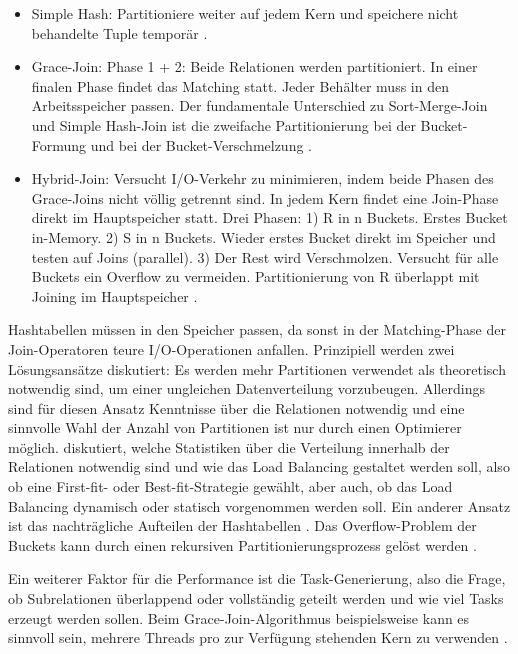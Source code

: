 \documentclass[a4paper,12pt,twoside]{article}
\begin{document}
{\begin{itemize}
	\item Simple Hash: Partitioniere weiter auf jedem Kern und speichere nicht behandelte Tuple temporär \parencite{Lu1994}.
	\item Grace-Join: Phase 1 + 2: Beide Relationen werden partitioniert. In einer finalen Phase findet das Matching statt. Jeder Behälter muss in den Arbeitsspeicher passen. Der fundamentale Unterschied zu Sort-Merge-Join und Simple Hash-Join ist die zweifache Partitionierung bei der Bucket-Formung und bei der Bucket-Verschmelzung \parencite{Schneider1989}.
	\item Hybrid-Join: Versucht I/O-Verkehr zu minimieren, indem beide Phasen des Grace-Joins nicht völlig getrennt sind. In jedem Kern findet eine Join-Phase direkt im Hauptspeicher statt. Drei Phasen: 1) R in n Buckets. Erstes Bucket in-Memory. 2) S in n Buckets. Wieder erstes Bucket direkt im Speicher und testen auf Joins (parallel). 3) Der Rest wird Verschmolzen. Versucht für alle Buckets ein Overflow zu vermeiden. Partitionierung von R überlappt mit Joining im Hauptspeicher \parencite{Schneider1989}.
\end{itemize}

Hashtabellen müssen in den Speicher passen, da sonst in der Matching-Phase der Join-Operatoren teure I/O-Operationen anfallen. Prinzipiell werden zwei Lösungsansätze diskutiert: Es werden mehr Partitionen verwendet als theoretisch notwendig sind, um einer ungleichen Datenverteilung vorzubeugen. Allerdings sind für diesen Ansatz Kenntnisse über die Relationen notwendig und eine sinnvolle Wahl der Anzahl von Partitionen ist nur durch einen Optimierer möglich. {\textcite{Lu1994}} diskutiert, welche Statistiken über die Verteilung innerhalb der Relationen notwendig sind und wie das Load Balancing gestaltet werden soll, also ob eine First-fit- oder Best-fit-Strategie gewählt, aber auch, ob das Load Balancing dynamisch oder statisch vorgenommen werden soll. Ein anderer Ansatz ist das nachträgliche Aufteilen der Hashtabellen \parencite{Mishra1992}. Das Overflow-Problem der Buckets kann durch einen rekursiven Partitionierungsprozess gelöst werden \parencite{DeWitt1985}.

Ein weiterer Faktor für die Performance ist die Task-Generierung, also die Frage, ob Subrelationen überlappend oder vollständig geteilt werden und wie viel Tasks erzeugt werden sollen. Beim Grace-Join-Algorithmus beispielsweise kann es sinnvoll sein, mehrere Threads pro zur Verfügung stehenden Kern zu verwenden \parencite{Lu1994}. 

}
\end{document}
